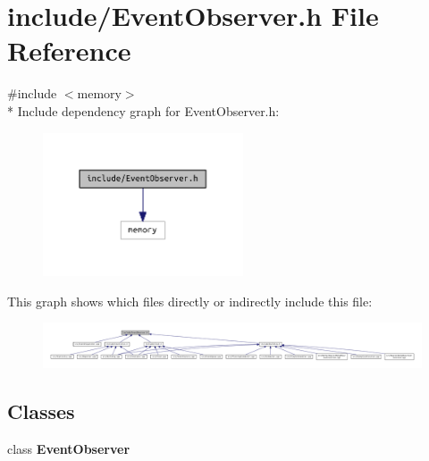 \section{include/\+Event\+Observer.h File Reference}
\label{_event_observer_8h}
{\ttfamily \#include $<$memory$>$}\\*
Include dependency graph for Event\+Observer.\+h\+:\nopagebreak
\begin{figure}[H]
\begin{center}
\leavevmode
\includegraphics[width=168pt]{_event_observer_8h__incl}
\end{center}
\end{figure}
This graph shows which files directly or indirectly include this file\+:\nopagebreak
\begin{figure}[H]
\begin{center}
\leavevmode
\includegraphics[width=350pt]{_event_observer_8h__dep__incl}
\end{center}
\end{figure}
\subsection*{Classes}
\begin{DoxyCompactItemize}
\item 
class {\bf Event\+Observer}
\end{DoxyCompactItemize}
